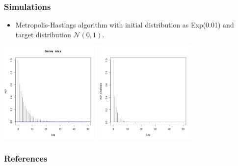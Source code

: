 \documentclass [xcolor=svgnames, t] {beamer}
\begin{document}
\begin{frame}
    \frametitle{Simulations}
    \begin{itemize}
        \item Metropolis-Hastings algorithm with initial distribution as Exp(0.01) and target distribution $\mathcal{N}(0, 1)$.
    \end{itemize}
    \vspace{2em}
    \centering
        \includegraphics[width=5cm]{acf_mh.jpg}
        \includegraphics[width=5cm]{acf_mh_chatterjee.jpg}
\end{frame}

\begin{frame} [allowframebreaks]\frametitle{References}
        
        
\end{frame}
\end{document}
